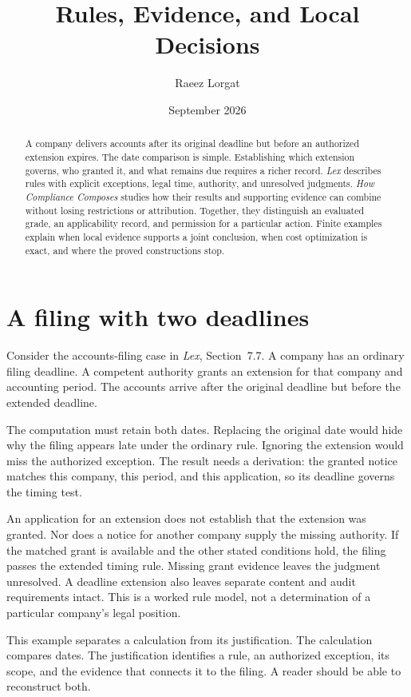 \documentclass{momentum}
\title{Rules, Evidence, and Local Decisions}
\author{Raeez Lorgat}
\date{September 2026}
\begin{document}
\maketitle

\begin{abstract}
A company delivers accounts after its original deadline but before an authorized extension expires. The date comparison is simple. Establishing which extension governs, who granted it, and what remains due requires a richer record. \emph{Lex} describes rules with explicit exceptions, legal time, authority, and unresolved judgments. \emph{How Compliance Composes} studies how their results and supporting evidence can combine without losing restrictions or attribution. Together, they distinguish an evaluated grade, an applicability record, and permission for a particular action. Finite examples explain when local evidence supports a joint conclusion, when cost optimization is exact, and where the proved constructions stop.
\end{abstract}

\section{A filing with two deadlines}

Consider the accounts-filing case in \emph{Lex}, Section~7.7. A company has an ordinary filing deadline. A competent authority grants an extension for that company and accounting period. The accounts arrive after the original deadline but before the extended deadline.

The computation must retain both dates. Replacing the original date would hide why the filing appears late under the ordinary rule. Ignoring the extension would miss the authorized exception. The result needs a derivation: the granted notice matches this company, this period, and this application, so its deadline governs the timing test.

An application for an extension does not establish that the extension was granted. Nor does a notice for another company supply the missing authority. If the matched grant is available and the other stated conditions hold, the filing passes the extended timing rule. Missing grant evidence leaves the judgment unresolved. A deadline extension also leaves separate content and audit requirements intact. This is a worked rule model, not a determination of a particular company's legal position. \cite[Section~7.7]{lex}

This example separates a calculation from its justification. The calculation compares dates. The justification identifies a rule, an authorized exception, its scope, and the evidence that connects it to the filing. A reader should be able to reconstruct both.
\end{document}
